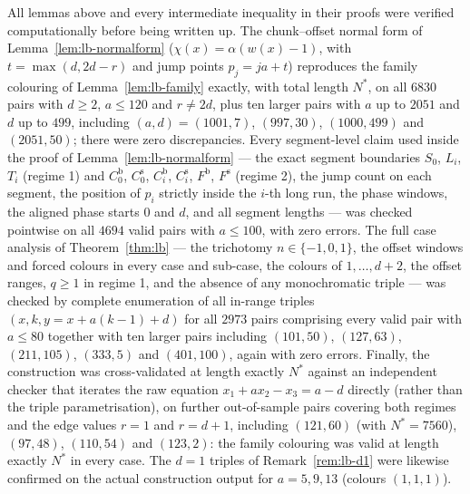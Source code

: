 \begin{remark}\label{rem:lb-comp}
All lemmas above and every intermediate inequality in their proofs were verified
computationally before being written up. The chunk--offset normal form of
Lemma~\ref{lem:lb-normalform} ($\chi(x) = \alpha(w(x)-1)$, with
$t = \max(d, 2d-r)$ and jump points $p_j = ja + t$) reproduces the family
colouring of Lemma~\ref{lem:lb-family} exactly, with total length $N^{*}$, on all
$6830$ pairs with $d \ge 2$, $a \le 120$ and $r \ne 2d$, plus ten larger pairs
with $a$ up to $2051$ and $d$ up to $499$, including $(a, d) = (1001, 7)$,
$(997, 30)$, $(1000, 499)$ and $(2051, 50)$; there were zero discrepancies. Every
segment-level claim used inside the proof of Lemma~\ref{lem:lb-normalform} ---
the exact segment boundaries $S_0$, $L_i$, $T_i$ (regime 1) and
$C_0^{\mathrm{b}}$, $C_0^{\mathrm{s}}$, $C_i^{\mathrm{b}}$, $C_i^{\mathrm{s}}$,
$F^{\mathrm{b}}$, $F^{\mathrm{s}}$ (regime 2), the jump count on each segment,
the position of $p_i$ strictly inside the $i$-th long run, the phase windows, the
aligned phase starts $0$ and $d$, and all segment lengths --- was checked
pointwise on all $4694$ valid pairs with $a \le 100$, with zero errors. The full
case analysis of Theorem~\ref{thm:lb} --- the trichotomy $n \in \{-1, 0, 1\}$,
the offset windows and forced colours in every case and sub-case, the colours of
$1, \dots, d+2$, the offset ranges, $q \ge 1$ in regime 1, and the absence of any
monochromatic triple --- was checked by complete enumeration of all in-range
triples $(x, k, y = x + a(k-1) + d)$ for all $2973$ pairs comprising every valid
pair with $a \le 80$ together with ten larger pairs including $(101, 50)$,
$(127, 63)$, $(211, 105)$, $(333, 5)$ and $(401, 100)$, again with zero errors.
Finally, the construction was cross-validated at length exactly $N^{*}$ against
an independent checker that iterates the raw equation
$x_1 + a x_2 - x_3 = a - d$ directly (rather than the triple parametrisation), on
further out-of-sample pairs covering both regimes and the edge values $r = 1$ and
$r = d + 1$, including $(121, 60)$ (with $N^{*} = 7560$), $(97, 48)$, $(110, 54)$
and $(123, 2)$: the family colouring was valid at length exactly $N^{*}$ in every
case. The $d = 1$ triples of Remark~\ref{rem:lb-d1} were likewise confirmed on
the actual construction output for $a = 5, 9, 13$ (colours $(1,1,1)$).
\end{remark}
